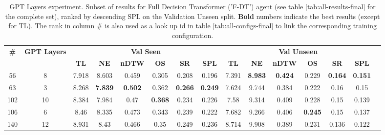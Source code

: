 \begin{table}
\centering
\caption{\label{tab:f_dt_layers}GPT Layers experiment. Subset of results for Full Decision Transformer ('F-DT') agent (see table \ref{tab:all-results-final} for the complete set), ranked by descending SPL on the Validation Unseen split. \textbf{Bold} numbers indicate the best results (except for TL). The rank in column \# is also used as a look up id in table \ref{tab:all-configs-final} to link the corresponding training configuration.}
\begin{tabular}{@{\hskip3pt}c@{\hskip3pt}c@{\hskip3pt}c@{\hskip3pt}c@{\hskip3pt}c@{\hskip3pt}c@{\hskip3pt}c@{\hskip3pt}c@{\hskip3pt}c@{\hskip3pt}c@{\hskip3pt}c@{\hskip3pt}c@{\hskip3pt}c@{\hskip3pt}c@{\hskip3pt}c}
\toprule
                                  \textbf{\#} & \textbf{GPT Layers} & \multicolumn{6}{c}{\textbf{Val Seen}} & \multicolumn{6}{c}{\textbf{Val Unseen}} \\
\cmidrule(l){3-8}\cmidrule(l){9-14}\textbf{~} &          \textbf{~} &       \textbf{TL} &     \textbf{NE} &   \textbf{nDTW} &     \textbf{OS} &     \textbf{SR} &    \textbf{SPL} &         \textbf{TL} &     \textbf{NE} &   \textbf{nDTW} &     \textbf{OS} &     \textbf{SR} &    \textbf{SPL} \\
\midrule
                                           56 &                   8 &             7.918 &           8.603 &           0.459 &           0.305 &           0.208 &           0.196 &               7.391 &  \textbf{8.983} &  \textbf{0.424} &           0.229 &  \textbf{0.164} &  \textbf{0.151} \\
                                           63 &                   3 &             8.268 &  \textbf{7.839} &  \textbf{0.502} &           0.362 &  \textbf{0.266} &  \textbf{0.249} &               7.624 &           9.744 &           0.384 &           0.222 &            0.16 &            0.15 \\
                                          102 &                  10 &             8.384 &           7.984 &            0.47 &  \textbf{0.368} &           0.234 &           0.226 &                7.58 &           9.314 &           0.409 &           0.228 &            0.15 &           0.139 \\
                                          106 &                   6 &              8.46 &           8.335 &           0.473 &           0.343 &           0.239 &           0.222 &               7.682 &           9.266 &           0.406 &  \textbf{0.245} &            0.15 &           0.137 \\
                                          140 &                  12 &             8.931 &            8.43 &           0.466 &            0.35 &           0.249 &           0.236 &               8.714 &           9.908 &           0.389 &           0.231 &           0.136 &           0.122 \\
\bottomrule
\end{tabular}
\end{table}
